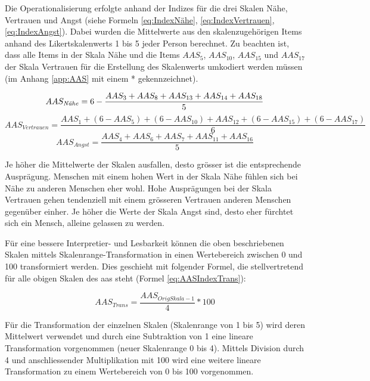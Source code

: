 Die Operationalisierung erfolgte anhand der Indizes für die drei Skalen Nähe, Vertrauen und Angst (siehe Formeln \ref{eq:IndexNähe}, \ref{eq:IndexVertrauen}, \ref{eq:IndexAngst}). Dabei wurden die Mittelwerte aus den skalenzugehörigen Items anhand des Likertskalenwerts 1 bis 5 jeder Person berechnet. Zu beachten ist, dass alle Items in der Skala Nähe und die Items $AAS_{5}$, $AAS_{10}$, $AAS_{15}$ und $AAS_{17}$ der Skala Vertrauen für die Erstellung des Skalenwerts umkodiert werden müssen (im Anhang \ref{app:AAS} mit einem * gekennzeichnet). 

\begin{equation}\label{eq:IndexNähe}
    AAS_{\text{\textit{N{\"a}he}}}=6-\frac{AAS_{3}+AAS_{8}+AAS_{13}+AAS_{14}+AAS_{18}}{5}
\end{equation}
\begin{equation}\label{eq:IndexVertrauen}
    AAS_{Vertrauen}=\frac{AAS_{1}+(6-AAS_{5})+(6-AAS_{10})+AAS_{12}+(6-AAS_{15})+(6-AAS_{17})}{6}
\end{equation}
\begin{equation}\label{eq:IndexAngst}
    AAS_{Angst}=\frac{AAS_{4}+AAS_{6}+AAS_{7}+AAS_{11}+AAS_{16}}{5}
\end{equation}

Je höher die Mittelwerte der Skalen ausfallen, desto grösser ist die entsprechende Ausprägung. Menschen mit einem hohen Wert in der Skala Nähe fühlen sich bei Nähe zu anderen Menschen eher wohl. Hohe Ausprägungen bei der Skala Vertrauen gehen tendenziell mit einem grösseren Vertrauen anderen Menschen gegenüber einher. Je höher die Werte der Skala Angst sind, desto eher fürchtet sich ein Mensch, alleine gelassen zu werden.

Für eine bessere Interpretier- und Lesbarkeit können die oben beschriebenen Skalen mittels Skalenrange-Transformation in einen Wertebereich zwischen 0 und 100 transformiert werden. Dies geschieht mit folgender Formel, die stellvertretend für alle obigen Skalen des \acrshort{aas} steht (Formel \ref{eq:AASIndexTrans}):

\begin{equation}\label{eq:AASIndexTrans}
    AAS_{Trans}=\frac{AAS_{OrigSkala - 1}}{4}*100
\end{equation}

Für die Transformation der einzelnen Skalen (Skalenrange von 1 bis 5) wird deren Mittelwert verwendet und durch eine Subtraktion von 1 eine lineare Transformation vorgenommen (neuer Skalenrange 0 bis 4). Mittels Division durch 4 und anschliessender Multiplikation mit 100 wird eine weitere lineare Transformation zu einem Wertebereich von 0 bis 100 vorgenommen.

